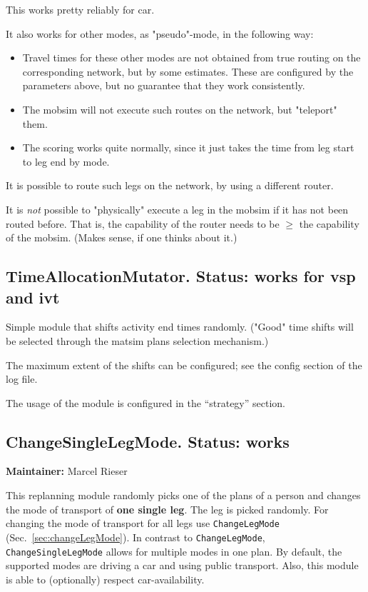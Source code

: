 This works pretty reliably for car.

It also works for other modes, as "pseudo"-mode, in the following way:
\begin{itemize}
	\item Travel times for these other modes are not obtained from true  routing on the corresponding network, but by some estimates. These  are configured by the parameters above, but no guarantee that they work  consistently.
	\item The mobsim will not execute such routes on the network, but "teleport" them.
	\item The scoring works quite normally, since it just takes the time from leg start to leg end by mode.
\end{itemize}

It is possible to route such legs on the network, by using a different router.

It is \emph{not} possible to "physically" execute a leg in the  mobsim if it has not been routed before. That is, the capability  of the router needs to be $\ge$ the capability of the mobsim.  (Makes sense, if one thinks about it.)

\subsection{TimeAllocationMutator.  Status: works for vsp and ivt}

Simple  module that shifts activity end times randomly. ("Good" time  shifts will be selected through the matsim plans selection mechanism.)

The maximum extent of the shifts can be configured; see the config  section of the log file. 

The usage of the module is configured in the ``strategy'' section.

\subsection{ ChangeSingleLegMode. Status: works}

\textbf{Maintainer:} Marcel Rieser

This replanning module randomly picks one of the plans of a person and changes the mode of transport of \textbf{one single leg}. The leg is picked randomly. For changing the mode of transport for all legs use \verb$ChangeLegMode$ (Sec.~\ref{sec:changeLegMode}). In contrast to \verb$ChangeLegMode$,  \verb$ChangeSingleLegMode$ allows for multiple modes in one plan. By default,  the supported modes are driving a car and using public transport. Also,  this module is able to (optionally) respect car-availability.

